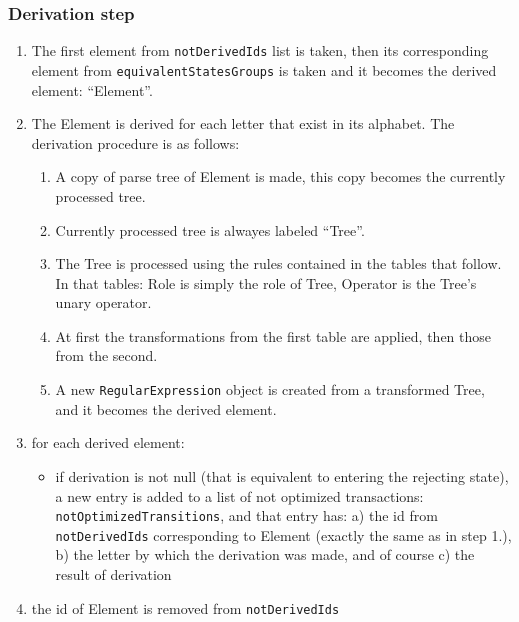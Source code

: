 \documentclass{article}
\begin{document}
\subsubsection*{Derivation step}

\begin{enumerate}

  \item The first element from \verb|notDerivedIds| list is taken, then its corresponding element from
  \verb|equivalentStatesGroups| is taken and it becomes the derived element: ``Element''.

  \item The Element is derived for each letter that exist in its alphabet. The derivation procedure
  is as follows:
  
  \begin{enumerate}

    \item A copy of parse tree of Element is made, this copy becomes the currently processed tree.

    \item Currently processed tree is alwayes labeled ``Tree''.

    \item The Tree is processed using the rules contained in the tables that follow. In that tables:
    Role is simply the role of Tree, Operator is the Tree's unary operator.
    
    \item At first the transformations from the first table are applied, then those from the second.

    \item A new \verb|RegularExpression| object is created from a transformed Tree, and it
    becomes the derived element.

  \end{enumerate}

  \item for each derived element:

  \begin{itemize}

    \item if derivation is not null (that is equivalent to entering the rejecting state), a new
    entry is added to a list of not optimized transactions: \verb|notOptimizedTransitions|, and that
    entry has: a) the id from \verb|notDerivedIds| corresponding to Element (exactly the same as in
    step 1.), b) the letter by which the derivation was made, and of course c) the result of
    derivation

  \end{itemize}

  \item the id of Element is removed from \verb|notDerivedIds|

\end{enumerate}
\end{document}
